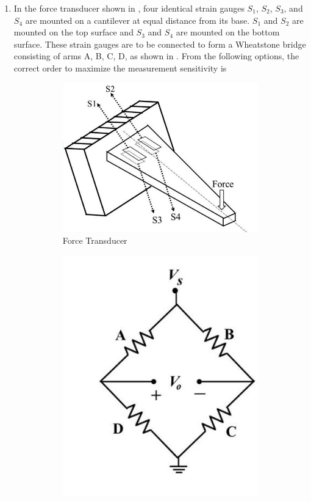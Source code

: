 \documentclass[journal,12pt,onecolumn]{IEEEtran}
\theoremstyle{remark}
\begin{document}
\begin{enumerate}
\begin{enumerate}
\end{enumerate}

\item In the force transducer shown in , four identical strain gauges $S_1$, $S_2$, $S_3$, and $S_4$ are mounted on a cantilever at equal distance from its base. $S_1$ and $S_2$ are mounted on the top surface and $S_3$ and $S_4$ are mounted on the bottom surface.  
These strain gauges are to be connected to form a Wheatstone bridge consisting of arms 
A, B, C, D, as shown in . From the following options, the correct order to maximize the
measurement sensitivity is \par\hfill{}
\begin{figure}[H]
\centering
\begin{subfigure}{.5\columnwidth}
  \centering
  \includegraphics[width=.6\columnwidth]{Figs/Q-15(a).png}
  \caption{Force Transducer}
  \label{15(a)}
\end{subfigure}%
\begin{subfigure}{.5\columnwidth}
  \centering
  \includegraphics[width=.4\columnwidth]{Figs/Q-15(b).png}

\end{subfigure}
\end{figure}
\end{enumerate}
\end{document}
